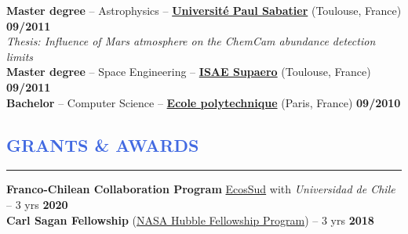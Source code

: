 \documentclass[11pt]{article}
\begin{document}
\vspace{-0.3cm}
\textbf{Master degree} -- Astrophysics --
\href{http://ezomp2.omp.obs-mip.fr/asep/index.php/eng}{\textbf{Université Paul Sabatier}} (Toulouse, France)
\hfill  { \bf 09/2011} \\
{\small \it Thesis: Influence of Mars atmosphere on the ChemCam abundance detection limits}\\

\vspace{-0.3cm}
\textbf{Master degree} -- Space Engineering -- \href{https://www.isae-supaero.fr/en/}{\textbf{\textbf{ISAE Supaero}}} (Toulouse, France) \hfill  { \bf 09/2011} \\

\vspace{-0.3cm}
\textbf{Bachelor} -- Computer Science -- \href{http://www.polytechnique.edu/en/}{\textbf{\textbf{Ecole polytechnique}}} (Paris, France) \hfill    { \bf 09/2010}\\






\vspace{-0.35cm}
\textcolor{RoyalBlue}{\section{\large GRANTS \& AWARDS}
\vspace{-0.45cm}\hrule}
\vspace{0.4cm}
\textbf{Franco-Chilean Collaboration Program} \href{https://www.univ-paris13.fr/ecos-sud/}{EcosSud} with {\it Universidad de Chile} -- 3 yrs \hfill   \textbf{2020}\\ %

\vspace{-0.3cm}
\textbf{Carl Sagan Fellowship} (\href{http://www.stsci.edu/stsci-research/fellowships/nasa-hubble-fellowship-program}{NASA Hubble Fellowship Program}) -- 3 yrs \hfill   \textbf{2018}\\ %
\end{document}
